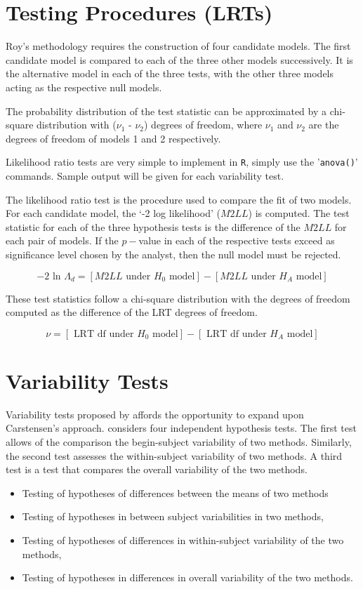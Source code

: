 \documentclass[12pt, a4paper]{report}
\theoremstyle{plain}
\theoremstyle{definition}
\theoremstyle{remark}
\begin{document}
\section{Testing Procedures (LRTs)}
Roy's methodology requires the construction of four candidate models. The first candidate model is compared to each of the three other models successively. It is the alternative model in each of the three tests, with the other three models acting as the respective null models.


The probability distribution of the test statistic can be approximated by a chi-square distribution with ($\nu_1$ - $\nu_2$) degrees of freedom, where $\nu_1$ and $\nu_2$ are the degrees of freedom of models 1 and 2 respectively.

Likelihood ratio tests are very simple to implement in \texttt{R}, simply use the '\texttt{anova()}' commands. Sample output will be given for each variability test.

The likelihood ratio test is the procedure used to compare the fit of two models. For each candidate model, the `-2 log likelihood' ($M2LL$) is computed. The test statistic for each of the three hypothesis tests is the difference of the $M2LL$ for each pair of models. If the $p-$value in each of the respective tests exceed as significance level chosen by the analyst, then the null model must be rejected.

\begin{equation}
-2\mbox{ ln }\Lambda_{d} =  [ M2LL \mbox{ under }H_{0} \mbox{ model}] - [ M2LL \mbox{ under }H_{A} \mbox{ model}]
\end{equation}

These test statistics follow a chi-square distribution with the degrees of freedom computed as the difference of the LRT degrees of freedom.

\begin{equation}
\nu = [\mbox{ LRT df under }H_{0} \mbox{ model}] - [\mbox{ LRT df under }H_{A} \mbox{ model}]
\end{equation}

\section{Variability Tests}
Variability tests proposed by \citet{ARoy2009} affords the opportunity to expand upon Carstensen's approach. \citet{ARoy2009} considers four independent hypothesis tests. The first test allows of the comparison the begin-subject variability of two methods. Similarly, the second test assesses the within-subject variability of two methods. A third test is a test that compares the overall variability of the two methods.
\begin{itemize}
	\item Testing of hypotheses of differences between the means of
	two methods\item Testing of hypotheses in between subject
	variabilities in two methods, \item Testing of hypotheses of
	differences in within-subject variability of the two methods,
	\item Testing of hypotheses in differences in overall variability
	of the two methods.
\end{itemize}
\end{document}
